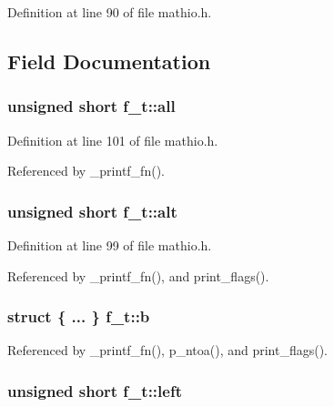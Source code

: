 Definition at line 90 of file mathio.\+h.



\subsection{Field Documentation}
\subsubsection[{\texorpdfstring{all}{all}}]{\setlength{\rightskip}{0pt plus 5cm}unsigned short f\+\_\+t\+::all}\hypertarget{unionf__t_aab0615c9ada80b0f986b58639ea8c480}{}\label{unionf__t_aab0615c9ada80b0f986b58639ea8c480}


Definition at line 101 of file mathio.\+h.



Referenced by \+\_\+printf\+\_\+fn().

\subsubsection[{\texorpdfstring{alt}{alt}}]{\setlength{\rightskip}{0pt plus 5cm}unsigned short f\+\_\+t\+::alt}\hypertarget{unionf__t_a907a8d8af4803c9a18bc0586d22d6881}{}\label{unionf__t_a907a8d8af4803c9a18bc0586d22d6881}


Definition at line 99 of file mathio.\+h.



Referenced by \+\_\+printf\+\_\+fn(), and print\+\_\+flags().

\subsubsection[{\texorpdfstring{b}{b}}]{\setlength{\rightskip}{0pt plus 5cm}struct \{ ... \}   f\+\_\+t\+::b}\hypertarget{unionf__t_a6ceb214475d9cd64026a8457abcf6269}{}\label{unionf__t_a6ceb214475d9cd64026a8457abcf6269}


Referenced by \+\_\+printf\+\_\+fn(), p\+\_\+ntoa(), and print\+\_\+flags().

\subsubsection[{\texorpdfstring{left}{left}}]{\setlength{\rightskip}{0pt plus 5cm}unsigned short f\+\_\+t\+::left}\hypertarget{unionf__t_a5f89cd6194ccc6a288f1fe31d39b2e64}{}\label{unionf__t_a5f89cd6194ccc6a288f1fe31d39b2e64}


